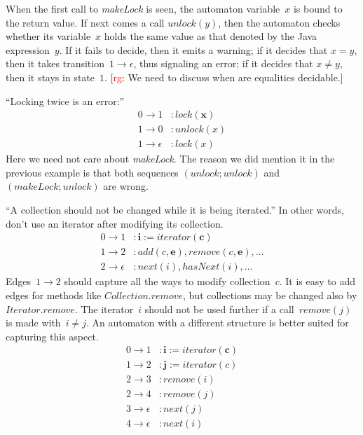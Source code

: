 \documentclass[a4paper]{article}
\newcommand{\todo}[2]{{\small [\textcolor{red}{#1}: #2]}}
\newcommand{\rg}[1]{\todo{rg}{#1}}
\theoremstyle{remark}
\begin{document}
When the first call to \textit{makeLock} is seen, the automaton variable~$x$ is bound to the return value.
If next comes a call $\mathit{unlock}(y)$, then the automaton checks whether its variable~$x$ holds the same value as that denoted by the Java expression~$y$.
If it fails to decide, then it emits a warning; if it decides that $x=y$, then it takes transition~$1\to\epsilon$, thus signaling an error; if it decides that $x\ne y$, then it stays in state~$1$.
\rg{We need to discuss when are equalities decidable.}

``Locking twice is an error:''
\begin{equation}
\begin{aligned}
0\to1&: \mathit{lock}(\mathbf x)\\
1\to0&: \mathit{unlock}(x)\\
1\to\epsilon&: \mathit{lock}(x)
\end{aligned}
\end{equation}
Here we need not care about \textit{makeLock}.
The reason we did mention it in the previous example is that both sequences $(\mathit{unlock}; \mathit{unlock})$ and $(\mathit{makeLock}; \mathit{unlock})$ are wrong.

``A collection should not be changed while it is being iterated.''
In other words, don't use an iterator after modifying its collection.
\begin{equation}\label{eq:iter1}
\begin{aligned}
0\to1&: \mathbf{i} := \mathit{iterator}(\mathbf{c})\\
1\to2&: \mathit{add}(c, \mathbf{e}), \mathit{remove}(c, \mathbf{e}), \ldots \\
2\to\epsilon&: \mathit{next}(i), \mathit{hasNext(i)}, \ldots
\end{aligned}
\end{equation}
Edges~$1\to2$ should capture all the ways to modify collection~$c$.
It is easy to add edges for methods like $\mathit{Collection}.\mathit{remove}$, but collections may be changed also by $\mathit{Iterator}.\mathit{remove}$.
The iterator~$i$ should not be used further if a call~$\mathit{remove}(j)$ is made with~$i\ne j$.
An automaton with a different structure is better suited for capturing this aspect.
\begin{equation}\label{eq:iter2}
\begin{aligned}
0\to1&: \mathbf{i} := \mathit{iterator}(\mathbf{c})\\
1\to2&: \mathbf{j} := \mathit{iterator}(c)\\
2\to3&: \mathit{remove}(i)\\
2\to4&: \mathit{remove}(j)\\
3\to\epsilon&: \mathit{next}(j)\\
4\to\epsilon&: \mathit{next}(i)
\end{aligned}
\end{equation}
\end{document}
